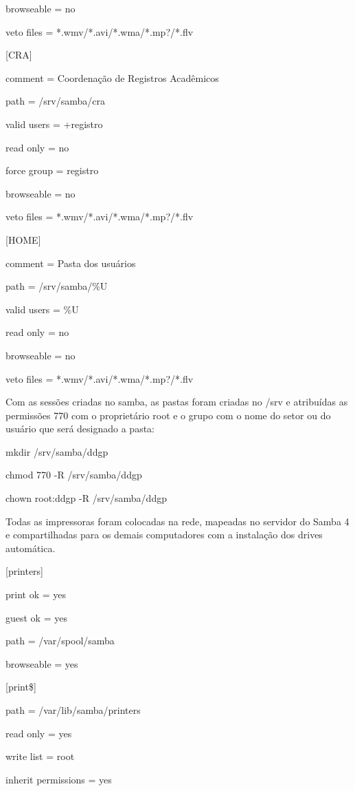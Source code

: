 browseable = no

veto files = *.wmv/*.avi/*.wma/*.mp?/*.flv

[CRA] 

comment = Coordenação de Registros Acadêmicos

path = /srv/samba/cra

valid users = +registro

read only = no

force group = registro

browseable = no

veto files = *.wmv/*.avi/*.wma/*.mp?/*.flv


[HOME] 

comment = Pasta dos usuários

path = /srv/samba/\%U

valid users = \%U

read only = no

browseable = no

veto files = *.wmv/*.avi/*.wma/*.mp?/*.flv

Com as sessões criadas no samba, as pastas foram criadas no /srv e atribuídas as permissões 770 com o proprietário root e o grupo com o nome do setor ou do usuário que será designado a pasta:

mkdir /srv/samba/ddgp

chmod 770 -R /srv/samba/ddgp

chown root:ddgp -R /srv/samba/ddgp

Todas as impressoras foram colocadas na rede, mapeadas no servidor do Samba 4 e compartilhadas para os demais computadores com a instalação dos drives automática.

[printers] 

print ok = yes 

guest ok = yes

path = /var/spool/samba 

browseable = yes

[print\$] 

path = /var/lib/samba/printers 

read only = yes

write list = root 

inherit permissions = yes